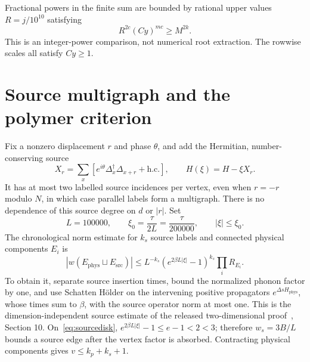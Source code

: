 \documentclass[11pt]{article}
\theoremstyle{plain}
\theoremstyle{remark}
\newcommand{\src}{\mathrm{src}}
\newcommand{\phys}{\mathrm{phys}}
\begin{document}
Fractional powers in the finite sum are bounded by rational upper values
$R=j/10^{10}$ satisfying
\begin{equation}\label{eq:rootcomparison}
R^{2c}(Cy)^{mc}\ge M^{2k}.
\end{equation}
This is an integer-power comparison, not numerical root extraction.
The rowwise scales all satisfy $Cy\ge1$.

\section{Source multigraph and the polymer criterion}\label{sec:source}

Fix a nonzero displacement $r$ and phase $\theta$, and add the Hermitian,
number-conserving source
\[
X_r=\sum_x[e^{i\theta}\Delta_x^\dagger\Delta_{x+r}+\mathrm{h.c.}],
\qquad H(\xi)=H-\xi X_r.
\]
It has at most two labelled source incidences per vertex, even when
$r=-r$ modulo $N$, in which case parallel labels form a multigraph.
There is no dependence of this source degree on $d$ or $|r|$.
Set
\begin{equation}\label{eq:sourcedisk}
L=100000,\qquad \xi_0=\frac{\tau}{2L}=\frac{\tau}{200000},
\qquad |\xi|\le\xi_0.
\end{equation}
The chronological norm estimate for $k_s$ source labels and connected
physical components $E_i$ is
\begin{equation}\label{eq:sourceactivity}
|w(E_\phys\sqcup E_\src)|
\le L^{-k_s}(e^{2\beta L|\xi|}-1)^{k_s}\prod_i R_{E_i}.
\end{equation}
To obtain it, separate source insertion times, bound the normalized phonon
factor by one, and use Schatten H\"older on the intervening positive
propagators $e^{\Delta s H_\phys}$, whose times sum to $\beta$, with the
source operator norm at most one. This is the dimension-independent
source estimate of the released two-dimensional proof~\cite{rensSharp},
Section 10. On~\eqref{eq:sourcedisk}, $e^{2\beta L|\xi|}-1\le e-1<2<3$;
therefore $w_s=3B/L$ bounds a source edge after the vertex factor is absorbed.
Contracting physical components gives $v\le k_p+k_s+1$.
\end{document}
